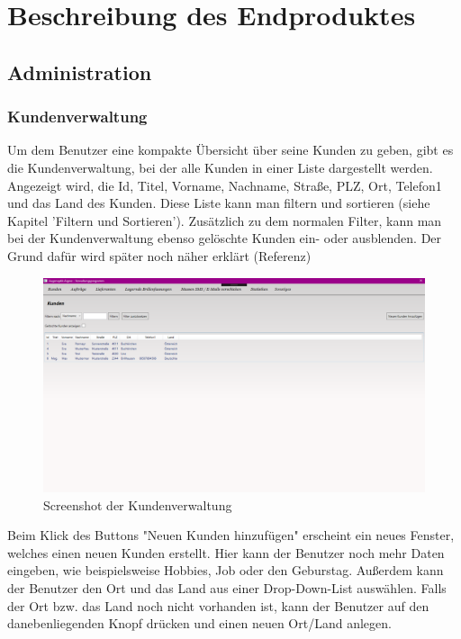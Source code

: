 \chapter{Beschreibung des Endproduktes}\label{cha:theoretical-background}
\section{Administration}
\subsection{Kundenverwaltung}
Um dem Benutzer eine kompakte Übersicht über seine Kunden zu geben, gibt es die Kundenverwaltung, bei der alle Kunden in einer Liste dargestellt werden. Angezeigt wird, die Id, Titel, Vorname, Nachname, Straße, PLZ, Ort, Telefon1 und das Land des Kunden. Diese Liste kann man filtern und sortieren (siehe Kapitel 'Filtern und Sortieren'). Zusätzlich zu dem normalen Filter, kann man bei der Kundenverwaltung ebenso gelöschte Kunden ein- oder ausblenden. Der Grund dafür wird später noch näher erklärt (Referenz)
\begin{figure}[H]
\begin{center}
	\includegraphics[scale=.25]{images/Kunden.png}
\end{center}
	\caption{Screenshot der Kundenverwaltung}
	\label{fig:sample}
\end{figure}
Beim Klick des Buttons "Neuen Kunden hinzufügen" erscheint ein neues Fenster, welches einen neuen Kunden erstellt. Hier kann der Benutzer noch mehr Daten eingeben, wie beispielsweise Hobbies, Job oder den Geburstag. Außerdem kann der Benutzer den Ort und das Land aus einer Drop-Down-List auswählen. Falls der Ort bzw. das Land noch nicht vorhanden ist, kann der Benutzer auf den danebenliegenden Knopf drücken und einen neuen Ort/Land anlegen. 
